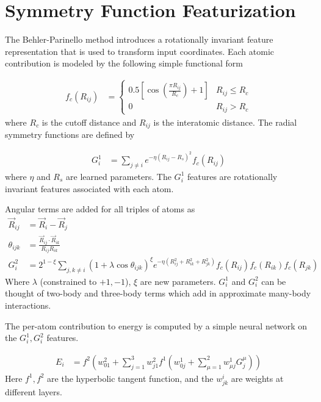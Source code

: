 \documentclass[book.tex]{subfiles}
\begin{document}
\section{Symmetry Function Featurization}

The Behler-Parinello method introduces a rotationally invariant feature representation that is used to transform input coordinates. Each atomic contribution is modeled by the following simple functional form

\begin{align}
f_c(R_{ij}) &= \begin{cases}
0.5 \left [ \cos\left(\frac{\pi R_{ij}}{R_c} \right ) + 1\right] & R_{ij} \leq R_c \\
0 & R_{ij} > R_c
\end{cases}
\end{align}
where $R_c$ is the cutoff distance and $R_{ij}$ is the interatomic distance. The radial symmetry functions are defined by

\begin{align}
    G^1_i &= \sum_{j\neq i} e^{-\eta (R_{ij}- R_s)^2} f_c(R_{ij})
\end{align}
where $\eta$ and $R_s$ are learned parameters. The $G^1_i$ features are rotationally invariant features associated with each atom.


Angular terms are added for all triples of atoms as
\begin{align}
    \vec{R}_{ij} &= \vec{R}_i - \vec{R}_j \\
    \theta_{ijk} &= \frac{\vec{R}_{ij}\cdot \vec{R}_{ik}}{R_{ij} R_{ik}} \\
    G^2_i &= 2^{1-\xi} \sum_{j,k \neq i} (1 + \lambda \cos \theta_{ijk})^{\xi} e^{-\eta(R_{ij}^2+R_{ik}^2 +R_{jk}^2)} f_c(R_{ij})f_c(R_{ik})f_c(R_{jk})
\end{align}
Where $\lambda$ (constrained to $+1,-1$), $\xi$ are new parameters. $G^1_i$ and $G^2_i$ can be thought of two-body and three-body terms which add in approximate many-body interactions.

The per-atom contribution to energy is computed by a simple neural network on the $G^1_i, G^2_i$ features.

\begin{align}
E_i &= f^2 \left ( w^2_{01} + \sum_{j=1}^3 w^2_{j1} f^1 \left (w^1_{0j} + \sum_{\mu=1}^2 w^1_{\mu j} G^\mu_j \right) \right)
\end{align}
Here $f^1, f^2$ are the hyperbolic tangent function, and the $w^i_{jk}$ are weights at different layers.
\end{document}
